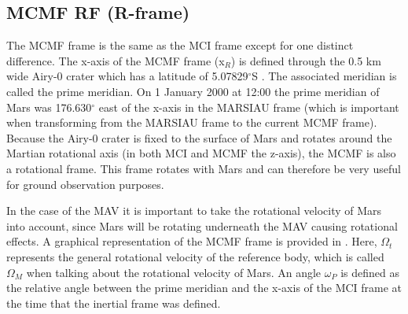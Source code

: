  




\subsection{\acl{MCMF} \ac{RF} (R-frame)}
\label{subsec:ECEF}
The \acf{MCMF} frame is the same as the \ac{MCI} frame except for one distinct difference. The x-axis of the \ac{MCMF} frame (x$_{R}$) is defined through the 0.5 km wide Airy-0 crater \citep{morton2003mapping} which has a latitude of 5.07829$^{\circ}$S \citep{duxbury2014location}. The associated meridian is called the prime meridian. On 1 January 2000 at 12:00 the prime meridian of Mars was 176.630$^{\circ}$ east of the x-axis in the MARSIAU frame (which is important when transforming from the MARSIAU frame to the current \ac{MCMF} frame)\citep{diaz2008generic,archinal2011report}. Because the Airy-0 crater is fixed to the surface of Mars and rotates around the Martian rotational axis (in both \ac{MCI} and \ac{MCMF} the z-axis), the \ac{MCMF} is also a rotational frame. This frame rotates with Mars and can therefore be very useful for ground observation purposes. 

In the case of the \ac{MAV} it is important to take the rotational velocity of Mars into account, since Mars will be rotating underneath the \ac{MAV} causing rotational effects. A graphical representation of the \ac{MCMF} frame is provided in . Here, $\Omega_{t}$ represents the general rotational velocity of the reference body, which is called $\Omega_{M}$ when talking about the rotational velocity of Mars. An angle $\omega_{P}$ is defined as the relative angle between the prime meridian and the x-axis of the \ac{MCI} frame at the time that the inertial frame was defined.






